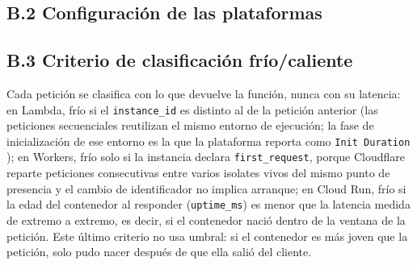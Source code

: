 \subsection*{B.2 Configuración de las plataformas}


\subsection*{B.3 Criterio de clasificación frío/caliente}

Cada petición se clasifica con lo que devuelve la función, nunca con su latencia:
en Lambda, frío si el \texttt{instance\_id} es distinto al de la petición anterior
(las peticiones secuenciales reutilizan el mismo entorno de ejecución; la fase de
inicialización de ese entorno es la que la plataforma reporta como \texttt{Init Duration}
\parencite{awsLambdaLifecycle}); en Workers, frío solo si
la instancia declara \texttt{first\_request}, porque Cloudflare reparte peticiones
consecutivas entre varios isolates vivos del mismo punto de presencia y el cambio
de identificador no implica arranque; en Cloud Run, frío si la edad del contenedor al
responder (\texttt{uptime\_ms}) es menor que la latencia medida de extremo a
extremo, es decir, si el contenedor nació dentro de la ventana de la petición. Este
último criterio no usa umbral: si el contenedor es más joven que la petición, solo
pudo nacer después de que ella salió del cliente.

